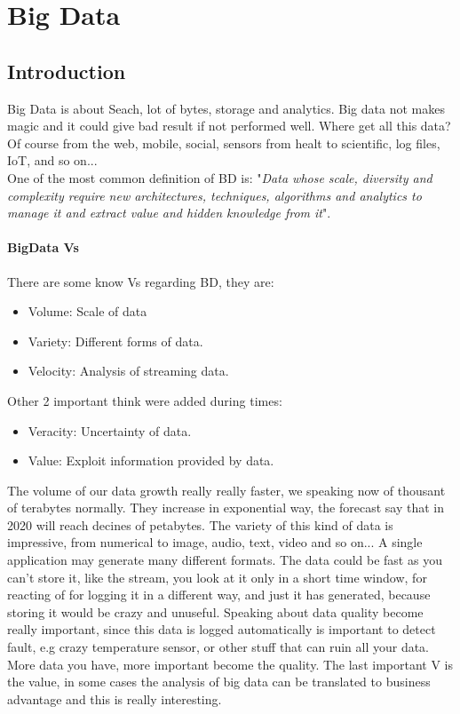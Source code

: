 \documentclass[12pt]{article}
\begin{document}
\section{Big Data} %
\subsection{Introduction}
Big Data is about Seach, lot of bytes, storage and analytics. Big data not makes magic and it could give bad result if not performed well. Where get all this data? Of course from the web, mobile, social, sensors from healt to scientific, log files, IoT, and so on...\\
One of the most common definition of BD is: "\textit{Data whose scale, diversity and complexity require new architectures, techniques, algorithms and analytics to manage it and extract value and hidden knowledge from it}".

\paragraph{BigData Vs} There are some know Vs regarding BD, they are:
\begin{itemize}
  \item Volume: Scale of data
  \item Variety: Different forms of data.
  \item Velocity: Analysis of streaming data.
\end{itemize}
Other 2 important think were added during times:
\begin{itemize}
  \item Veracity: Uncertainty of data.
  \item Value: Exploit information provided by data.
\end{itemize}

The volume of our data growth really really faster, we speaking now of thousant of terabytes normally. They increase in exponential way, the forecast say that in 2020 will reach decines of petabytes. The variety of this kind of data is impressive, from numerical to image, audio, text, video and so on... A single application may generate many different formats. The data could be fast as you can't store it, like the stream, you look at it only in a short time window, for reacting of for logging it in a different way, and just it has generated, because storing it would be crazy and unuseful. Speaking about data quality become really important, since this data is logged automatically is important to detect fault, e.g crazy temperature sensor, or other stuff that can ruin all your data. More data you have, more important become the quality. The last important V is the value, in some cases the analysis of big data can be translated to business advantage and this is really interesting.
\end{document}
